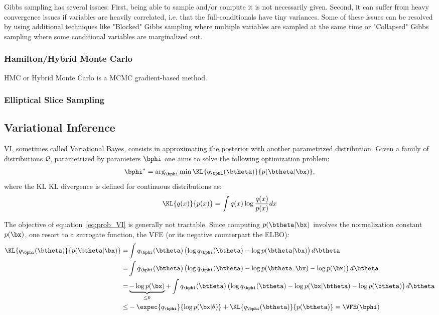 Gibbs sampling has several issues:
First, being able to sample and/or compute it is not necessarily given.
Second, it can suffer from heavy convergence issues if variables are heavily correlated, i.e. that the full-conditionals have tiny variances.
Some of these issues can be resolved by using additional techniques like "Blocked" Gibbs sampling where multiple variables are sampled at the same time or "Collapsed" Gibbs sampling where some conditional variables are marginalized out. 

\subsubsection{Hamilton/Hybrid Monte Carlo}

\acf{HMC} or Hybrid Monte Carlo \cite{betancourt2017conceptual} is a \ac{MCMC} gradient-based method.


\subsubsection{Elliptical Slice Sampling}


\subsection{Variational Inference}

\acf{VI}, sometimes called Variational Bayes, consists in approximating the posterior with another parametrized distribution.
Given a family of distributions $\mathcal{Q}$, parametrized by parameters $\bphi$ one aims to solve the following optimization problem:
\begin{align}
\bphi^* = \arg_{\bphi}\min \KL{q_{\bphi}(\btheta)}{p(\btheta|\bx)},
\label{eq:prob_VI}
\end{align}
where the $\mathrm{KL}$ \ac{KL} divergence is defined for continuous distributions as:
\begin{align}
\KL{q(x)}{p(x)} = \int q(x) \log \frac{q(x)}{p(x)}dx
\end{align}

The objective of equation~\eqref{eq:prob_VI} is generally not tractable.
Since computing $p(\btheta|\bx)$ involves the normalization constant $p(\bx)$, one resort to a surrogate function, the \ac{VFE} (or its negative counterpart the \ac{ELBO}):
\begin{align}
\KL{q_{\bphi}(\btheta)}{p(\btheta|\bx)} =& \int q_{\bphi}(\btheta) \left(\log q_{\bphi}(\btheta) - \log p(\btheta|\bx)\right)d\btheta\\
=&\int q_{\bphi}(\btheta) \left(\log q_{\bphi}(\btheta) - \log p(\btheta, \bx) - \log p(\bx)\right)d\btheta\\
=&\underbrace{- \log p(\bx)}_{\leq 0} + \int q_{\bphi}(\btheta) \left(\log q_{\bphi}(\btheta) - \log p(\bx|\btheta)- \log p(\btheta) \right)d\btheta\\
\leq& -\expec{q_{\bphi}}{\log p(\bx|\theta)} + \KL{q_{\bphi}(\btheta)}{p(\btheta)} = \VFE(\bphi)
\end{align}


